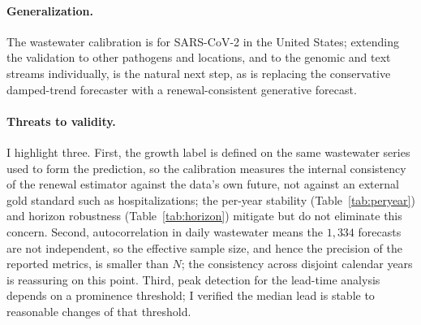 \documentclass[10pt,twocolumn]{article}
\theoremstyle{definition}
\begin{document}
\paragraph{Generalization.}
The wastewater calibration is for SARS-CoV-2 in the United States; extending the
validation to other pathogens and locations, and to the genomic and text streams
individually, is the natural next step, as is replacing the conservative
damped-trend forecaster with a renewal-consistent generative forecast.

\paragraph{Threats to validity.}
I highlight three. First, the growth label is defined on the same wastewater
series used to form the prediction, so the calibration measures the internal
consistency of the renewal estimator against the data's own future, not against an
external gold standard such as hospitalizations; the per-year stability
(Table~\ref{tab:peryear}) and horizon robustness (Table~\ref{tab:horizon})
mitigate but do not eliminate this concern. Second, autocorrelation in daily
wastewater means the $1{,}334$ forecasts are not independent, so the effective
sample size, and hence the precision of the reported metrics, is smaller than
$N$; the consistency across disjoint calendar years is reassuring on this point.
Third, peak detection for the lead-time analysis depends on a prominence
threshold; I verified the median lead is stable to reasonable changes of that
threshold.
\end{document}
